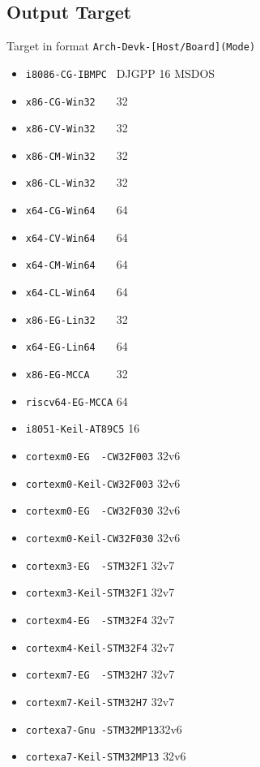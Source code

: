 
\subsection{Output Target}

Target in format \verb`Arch-Devk-[Host/Board](Mode)`
\begin{itemize}
\item \verb`i8086-CG-IBMPC ` {DJGPP 16 MSDOS}
\item \verb`x86-CG-Win32   ` {32} %
\item \verb`x86-CV-Win32   ` {32} %
\item \verb`x86-CM-Win32   ` {32}
\item \verb`x86-CL-Win32   ` {32}

\item \verb`x64-CG-Win64   ` {64} %
\item \verb`x64-CV-Win64   ` {64} %
\item \verb`x64-CM-Win64   ` {64}
\item \verb`x64-CL-Win64   ` {64}

\item \verb`x86-EG-Lin32   ` {32} %
\item \verb`x64-EG-Lin64   ` {64} %
\item \verb`x86-EG-MCCA    ` {32} %
\item \verb`riscv64-EG-MCCA` {64}
\item \verb`i8051-Keil-AT89C5` {16}

\item \verb`cortexm0-EG  -CW32F003` {32}v6
\item \verb`cortexm0-Keil-CW32F003` {32}v6
\item \verb`cortexm0-EG  -CW32F030` {32}v6
\item \verb`cortexm0-Keil-CW32F030` {32}v6

\item \verb`cortexm3-EG  -STM32F1` {32}v7
\item \verb`cortexm3-Keil-STM32F1` {32}v7

\item \verb`cortexm4-EG  -STM32F4` {32}v7
\item \verb`cortexm4-Keil-STM32F4` {32}v7

\item \verb`cortexm7-EG  -STM32H7` {32}v7
\item \verb`cortexm7-Keil-STM32H7` {32}v7

\item \verb`cortexa7-Gnu -STM32MP13`{32}v6 %
\item \verb`cortexa7-Keil-STM32MP13` {32}v6
\end{itemize}

